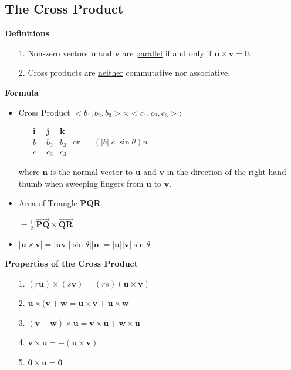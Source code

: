 \documentclass[10pt, twocolumn]{article}
\begin{document}
\subsection{The Cross Product}
{\bf Definitions}
\begin{enumerate}
\item[1.]{Non-zero vectors $\mathbf{u}$ and $\mathbf{v}$ are \underline{parallel} if and only if $\mathbf{u} \times \mathbf{v} = 0$.}
\item[2.]{Cross products are \underline{neither} commutative nor associative.}
\end{enumerate}
{\bf Formula}
\begin{itemize}
\item Cross Product $<b_1,b_2,b_3> \times <c_1,c_2,c_3>$:
\begin{center}
$=\begin{array}{|ccc|}
\mathbf{i} & \mathbf{j} & \mathbf{k} \\
b_1 & b_2 & b_3 \\
c_1 & c_2 & c_3
\end{array}$ \hspace{20pt}
or \hspace{20pt}
$=(|b||c|\sin\theta)n$
\end{center}
where $\mathbf{n}$ is the normal vector to $\mathbf{u}$ and $\mathbf{v}$ in the direction of the right hand thumb when sweeping fingers from $\mathbf{u}$ to $\mathbf{v}$.
\item Area of Triangle {\bf PQR}
\begin{center}
$=\frac{1}{2}|\vec{\textbf{PQ}} \times \vec{\textbf{QR}}$
\end{center}
\item $|\mathbf{u}\times\mathbf{v}| = |\mathbf{u}\mathbf{v}||\sin\theta||\mathbf{n}| = |\mathbf{u}||\mathbf{v}|\sin\theta$
\end{itemize}
{\bf Properties of the Cross Product}
\begin{enumerate}
\item[1.]{$(r\mathbf{u})\times(s\mathbf{v}) = (rs)(\mathbf{u}\times\mathbf{v})$}
\item[2.]{$\mathbf{u}\times(\mathbf{v}+\mathbf{w} = \mathbf{u}\times\mathbf{v} + \mathbf{u}\times\mathbf{w}$}
\item[3.]{$(\mathbf{v}+\mathbf{w})\times\mathbf{u} = \mathbf{v}\times\mathbf{u} + \mathbf{w}\times\mathbf{u}$}
\item[4.]{$\mathbf{v}\times\mathbf{u} = -(\mathbf{u}\times\mathbf{v})$}
\item[5.]{$\mathbf{0}\times\mathbf{u} = \mathbf{0}$}
\end{enumerate}
\end{document}
